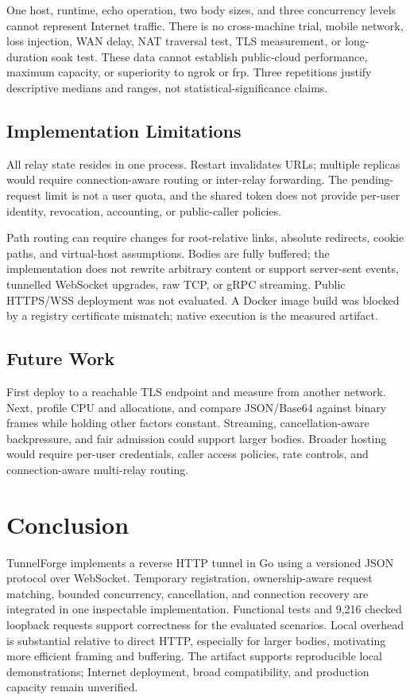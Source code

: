\documentclass[conference,letterpaper]{IEEEtran}
\begin{document}
One host, runtime, echo operation, two body sizes, and three concurrency levels
cannot represent Internet traffic. There is no cross-machine trial, mobile
network, loss injection, WAN delay, NAT traversal test, TLS measurement, or
long-duration soak test. These data cannot establish public-cloud performance,
maximum capacity, or superiority to ngrok or frp. Three repetitions justify
descriptive medians and ranges, not statistical-significance claims.

\subsection{Implementation Limitations}
All relay state resides in one process. Restart invalidates URLs; multiple
replicas would require connection-aware routing or inter-relay forwarding.
The pending-request limit is not a user quota, and the shared token does not
provide per-user identity, revocation, accounting, or public-caller policies.

Path routing can require changes for root-relative links, absolute redirects,
cookie paths, and virtual-host assumptions. Bodies are fully buffered; the
implementation does not rewrite arbitrary content or support server-sent
events, tunnelled WebSocket upgrades, raw TCP, or gRPC streaming. Public
HTTPS/WSS deployment was not evaluated. A Docker image build was blocked by
a registry certificate mismatch; native execution is the measured artifact.

\subsection{Future Work}
First deploy to a reachable TLS endpoint and measure from another network.
Next, profile CPU and allocations, and compare JSON/Base64 against binary
frames while holding other factors constant. Streaming, cancellation-aware
backpressure, and fair admission could support larger bodies. Broader hosting
would require per-user credentials, caller access policies, rate controls,
and connection-aware multi-relay routing.

\section{Conclusion}
TunnelForge implements a reverse HTTP tunnel in Go using a versioned JSON
protocol over WebSocket. Temporary registration, ownership-aware request
matching, bounded concurrency, cancellation, and connection recovery are
integrated in one inspectable implementation. Functional tests and 9,216
checked loopback requests support correctness for the evaluated scenarios.
Local overhead is substantial relative to direct HTTP, especially for larger
bodies, motivating more efficient framing and buffering. The artifact supports
reproducible local demonstrations; Internet deployment, broad compatibility,
and production capacity remain unverified.
\end{document}
